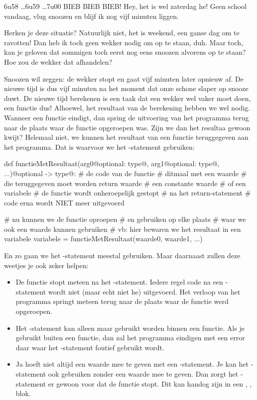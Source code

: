 6u58 \dots 6u59 \dots 7u00 BIEB BIEB BIEB!
\newline
Hey, het is wel zaterdag he!
\newline
Geen school vandaag, vlug snoozen en blijf ik nog vijf minuten liggen.
\newline
\par
Herken je deze situatie?
Natuurlijk niet, het is weekend, een ganse dag om te ravotten!
Dan heb ik toch geen wekker nodig om op te staan, duh.
Maar toch, kan je geloven dat sommigen toch eerst nog eens snoozen alvorens op te staan?
Hoe zou de wekker dat afhandelen?
\par
Snoozen wil zeggen: de wekker stopt en gaat vijf minuten later opnieuw af.
De nieuwe tijd is dus vijf minuten na het moment dat onze schone slaper op snooze duwt.
De nieuwe tijd berekenen is een taak dat een wekker wel vaker moet doen,
een functie dus!
\newline
Alhoewel, het resultaat van de berekening hebben we wel nodig.
Wanneer een functie eindigt,
dan spring de uitvoering van het programma terug naar de plaats waar de functie opgeroepen was.
Zijn we dan het resultaa gewoon kwijt?
Helemaal niet, we kunnen het resultaat van een functie teruggegeven aan het programma.
Dat is waarvoor we het -statement gebruiken:
\begin{pyEnv}
def functieMetResultaat(arg0@optional: type@, arg1@optional: type@, ...)@optional -> type@:
    # de code van de functie
	# ditmaal met een waarde
	# die teruggegeven moet worden
	return waarde           # een constante waarde
	                        # of een variabele
	# de functie wordt onheroepelijk gestopt
	# na het return-statement
	# code erna wordt NIET meer uitgevoerd

# nu kunnen we de functie oproepen
# en gebruiken op elke plaats
# waar we ook een waarde kunnen gebruiken
# vb: hier bewaren we het resultaat in een variabele
variabele = functieMetResultaat(waarde0, waarde1, ...)
\end{pyEnv}
En zo gaan we het -statement meestal gebruiken.
Maar daarnaast zullen deze weetjes je ook zeker helpen:
\begin{itemize}
	\item
		De functie stopt meteen na het -statement.
		Iedere regel code na een -statement wordt niet (maar echt niet he) uitgevoerd.
		Het verloop van het programma springt meteen terug naar de plaats waar de functie werd opgeroepen.
	\item
		Het -statement kan alleen maar gebruikt worden binnen een functie.
		Als je  gebruikt buiten een functie,
		dan zal het programma eindigen met een error daar waar het -statement
		foutief gebruikt wordt.
	\item
		Ja hoeft niet altijd een waarde mee te geven met een -statement.
		Je kan het -statement ook gebruiken zonder een waarde mee te geven.
		Dan zorgt het -statement er gewoon voor dat de functie stopt.
		Dit kan handog zijn in een , ,  blok.
\end{itemize}
